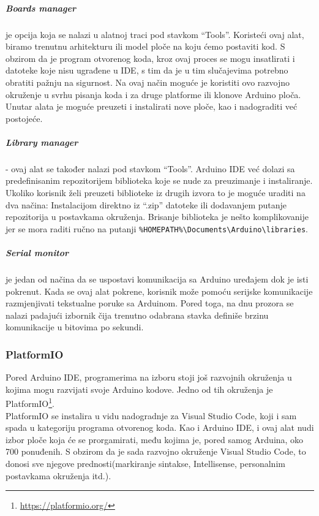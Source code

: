\documentclass[../Document.tex]{subfiles}
\begin{document}
\subparagraph{Boards manager} je opcija koja se nalazi u alatnoj traci pod stavkom ``Tools''. Koristeći ovaj alat, biramo trenutnu arhitekturu ili model ploče na koju ćemo postaviti kod. S obzirom da je program otvorenog koda, kroz ovaj proces se mogu insatlirati i datoteke koje nisu ugrađene u IDE, s tim da je u tim slučajevima potrebno obratiti pažnju na sigurnost. Na ovaj način moguće je koristiti ovo razvojno okruženje u svrhu pisanja koda i za druge platforme ili klonove Arduino ploča. Unutar alata je moguće preuzeti i instalirati nove ploče, kao i nadograditi već postojeće.


\subparagraph{Library manager} - ovaj alat se također nalazi pod stavkom ``Tools''. Arduino IDE već dolazi sa predefinisanim repozitorijem biblioteka koje se nude za preuzimanje i instaliranje. Ukoliko korisnik želi preuzeti biblioteke iz drugih izvora to je moguće uraditi na dva načina: Instalacijom direktno iz ``.zip'' datoteke ili dodavanjem putanje repozitorija u postavkama okruženja. Brisanje biblioteka je nešto komplikovanije jer se mora raditi ručno na putanji \verb|%HOMEPATH%\Documents\Arduino\libraries|.


\subparagraph{Serial monitor} je jedan od načina da se uspostavi komunikacija sa Arduino uređajem dok je isti pokrenut. Kada se ovaj alat pokrene, korisnik može pomoću serijske komunikacije razmjenjivati tekstualne poruke sa Arduinom. Pored toga, na dnu prozora se nalazi padajući izbornik čija trenutno odabrana stavka definiše brzinu komunikacije u bitovima po sekundi.


\subsubsection{PlatformIO}

Pored Arduino IDE, programerima na izboru stoji još razvojnih okruženja u kojima mogu razvijati svoje Arduino kodove. Jedno od tih okruženja je PlatformIO\footnote{\url{https://platformio.org/}}.\\

PlatformIO se instalira u vidu nadogradnje za Visual Studio Code, koji i sam spada u kategoriju programa otvorenog koda. Kao i Arduino IDE, i ovaj alat nudi izbor ploče koja će se prorgamirati, među kojima je, pored samog Arduina, oko 700 ponuđenih\cite{platformIOHome}. S obzirom da je sada razvojno okruženje Visual Studio Code, to donosi sve njegove prednosti(markiranje sintakse, Intellisense, personalnim postavkama okruženja itd.).\\
\end{document}

